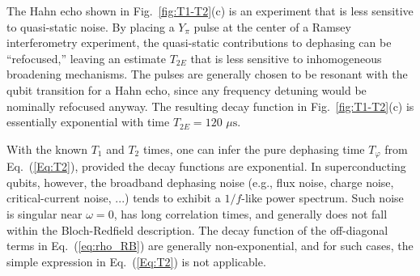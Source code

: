 \documentclass[aip,apr,twocolumn,showpacs,superscriptaddress,groupedaddress,nofootinbib,reprint]{revtex4-1}  %
\begin{document}
The Hahn echo shown in Fig.~\ref{fig:T1-T2}(c) is an experiment that is less sensitive to quasi-static noise. By placing a $Y_{\pi}$ pulse at the center of a Ramsey interferometry experiment, the quasi-static contributions to dephasing can be ``refocused,'' leaving an estimate $T_{2E}$ that is less sensitive to inhomogeneous broadening mechanisms. The pulses are generally chosen to be resonant with the qubit transition for a Hahn echo, since any frequency detuning would be nominally refocused anyway. The resulting decay function in Fig.~\ref{fig:T1-T2}(c) is essentially exponential with time $T_{2E} = 120$ $\mu\mathrm{s}$.

With the known $T_1$ and $T_2$ times, one can infer the pure dephasing time $T_{\varphi}$ from Eq.~(\ref{Eq:T2}), provided the decay functions are exponential. In superconducting qubits, however, the broadband dephasing noise (e.g., flux noise, charge noise, critical-current noise, ...) tends to exhibit a $1/f$-like power spectrum. Such noise is singular near $\omega = 0$, has long correlation times, and generally does not fall within the Bloch-Redfield description. The decay function of the off-diagonal terms in Eq.~(\ref{eq:rho_RB}) are generally non-exponential, and for such cases, the simple expression in Eq.~(\ref{Eq:T2}) is not applicable.
\end{document}
